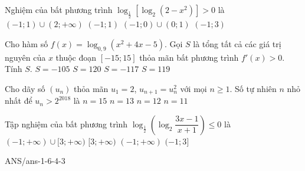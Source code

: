 \begin{ex}
	Nghiệm của bất phương trình $\log_{\tfrac{1}{2}}\left[\log_2(2-x^2)\right]>0$ là
	\choice
	{$(-1;1)\cup (2;+\infty)$}
	{$(-1;1)$}
	{\True $(-1;0)\cup (0;1)$}
	{$(-1;3)$}
\end{ex}
\begin{ex}
	Cho hàm số $f(x)=\log_{0{,}9} \left(x^2+4x-5\right)$. Gọi $S$ là tổng tất cả các giá trị nguyên của $x$ thuộc đoạn $[-15;15]$ thỏa mãn bất phương trình $f'(x)>0$. Tính $S$.
	\choice
	{\True $S=-105$}
	{$S=120$}
	{$S=-117$}
	{$S=119$}
\end{ex}
\begin{ex}
	Cho dãy số $\left(u_n\right)$ thỏa mãn $u_1=2$, $u_{n+1}=u_n^2$ với mọi $n\ge 1$. Số tự nhiên $n$ nhỏ nhất để $u_n>2^{2018}$ là
	\choice
	{$n=15$}
	{$n=13$}
	{\True $n=12$}
	{$n=11$}
\end{ex}
\begin{ex}
	Tập nghiệm của bất phương trình $\log_\frac{1}{2} \left ( \log_2 \dfrac{3x-1}{x+1}\right ) \leq 0$ là
	\choice
	{\True $(-1;+\infty) \cup [3;+\infty)$}
	{$[3;+\infty)$}
	{$(-1;+\infty)$}
	{$(-1;3]$}
	\loigiai{
		$\log_\frac{1}{2} \left ( \log_2 \dfrac{3x-1}{x+1}\right ) \leq 0 \Leftrightarrow \dfrac{3x-1}{x+1} \geq 2 \Leftrightarrow \dfrac{x-3}{x+1} \geq 0 \Leftrightarrow x \in (-1;+\infty) \cup [3;+\infty)$.
	}
\end{ex}
\begin{indapan}{10}
	{ANS/ans-1-6-4-3}
\end{indapan}


